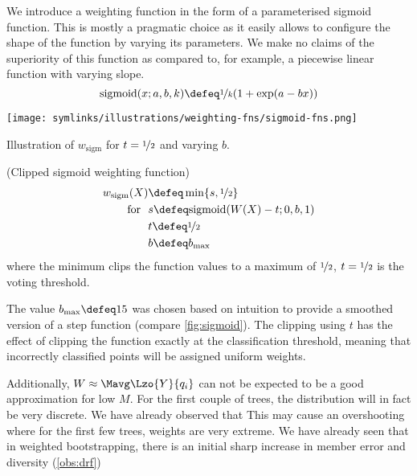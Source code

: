 \documentclass[../main.tex]{subfiles}
\begin{document}
We introduce a weighting function in the form of a parameterised sigmoid function. This is mostly a pragmatic choice as it easily allows to configure the shape of the function by varying its parameters. We make no claims of the superiority of this function as compared to, for example, a piecewise linear function with varying slope.
$$
\text{sigmoid}(x;a,b,k) \defeq \nicefrac{1}{k} (1 + \exp(a-bx))
$$
\begin{marginfigure}
    \texttt{[image: symlinks/illustrations/weighting-fns/sigmoid-fns.png]}
    \caption{Illustration of $w_{\text{sigm}}$ for $t = \nicefrac{1}{2}$ and varying $b$.}
    \label{fig:sigmoid}
\end{marginfigure}
    \label{def:sigmoid}
    \begin{definition} (Clipped sigmoid weighting function)
    \begin{align*}
    w_{\text{sigm} }(X) &\defeq \min\{ s, \nicefrac{1}{2} \} \\
    \text{for}~ ~ & s \defeq \text{sigmoid}(W(X) - t; 0, b, 1) \\
    & t \defeq \nicefrac{1}{2} \\
    & b \defeq b_\text{max}
    \end{align*}
    where the minimum clips the function values to a maximum of $\nicefrac{1}{2}$, $t = \nicefrac{1}{2}$ is the voting threshold.
\end{definition} 
The value $b_{\text{max}} \defeq 15$ was chosen based on intuition to provide a smoothed version of a step function (compare \cref{fig:sigmoid}). The clipping using $t$ has the effect of clipping the function exactly at the classification threshold, meaning that incorrectly classified points will be assigned uniform weights.

Additionally, $W \approx \Mavg\Lzo{Y}{q_{i}}$ can not be expected to be a good approximation for low $M$. For the first couple of trees, the distribution will in fact be very discrete. We have already observed that 
This may cause an overshooting where for the first few trees, weights are very extreme. We have already seen that in weighted bootstrapping, there is an initial sharp increase in member error and diversity (\cf \ref{obs:drf})
\end{document}
